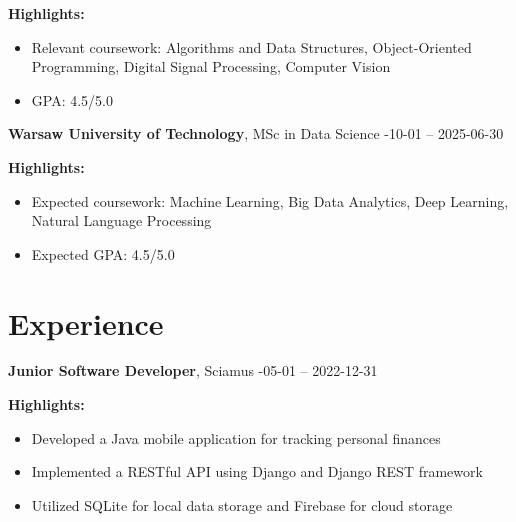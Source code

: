 \documentclass[10pt, letterpaper]{article}
\begin{document}
\vspace{5pt}

\noindent\textbf{Highlights:}
\begin{itemize}
    
    \item Relevant coursework: Algorithms and Data Structures, Object-Oriented Programming, Digital Signal Processing, Computer Vision
    
    \item GPA: 4.5/5.0
    
\end{itemize}

\begin{paracol}{2}
\noindent\textbf{Warsaw University of Technology}, MSc in Data Science -10-01 -- 2025-06-30
\end{paracol}

\vspace{5pt}

\noindent\textbf{Highlights:}
\begin{itemize}
    
    \item Expected coursework: Machine Learning, Big Data Analytics, Deep Learning, Natural Language Processing
    
    \item Expected GPA: 4.5/5.0
    
\end{itemize}


\section*{Experience}

\begin{paracol}{2}
\noindent\textbf{Junior Software Developer}, Sciamus -05-01 -- 2022-12-31
\end{paracol}

\vspace{5pt}

\noindent\textbf{Highlights:}
\begin{itemize}
    
    \item Developed a Java mobile application for tracking personal finances
    
    \item Implemented a RESTful API using Django and Django REST framework
    
    \item Utilized SQLite for local data storage and Firebase for cloud storage
    
\end{itemize}
\end{document}
